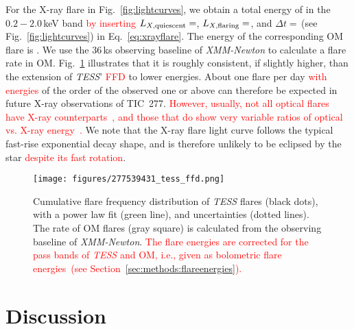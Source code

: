 \documentclass[twocolumn]{aastex631}
\begin{document}
For the X-ray flare in Fig.~\ref{fig:lightcurves}, we obtain a total energy of \eepic in the $0.2-2.0\,$keV band \textcolor{red}{by inserting} $L_{X,\rm quiescent}=$\LXquiet\unskip, $L_{X,\rm flaring}=$\LXflaring\unskip, and $\Delta t =$\xraydur\unskip\,(see Fig.~\ref{fig:lightcurves}) in Eq.~\ref{eq:xrayflare}. The energy of the corresponding OM flare is \eom\unskip. We use the $36\,$ks observing baseline of \textit{XMM-Newton} to calculate a flare rate in OM. Fig.~\ref{fig:ffd} illustrates that it is roughly consistent, if slightly higher, than the extension of \textit{TESS}' \textcolor{red}{FFD} to lower energies. About one flare per day \textcolor{red}{with energies} of the order of the observed one or above can therefore be expected in future X-ray observations of TIC~277. \textcolor{red}{However, usually, not all optical flares have X-ray counterparts~\citep{paudel2021simultaneous}, and those that do show very variable ratios of optical vs. X-ray energy~\citep{guarcello2019simultaneous, kuznetsov2021stellar}.} We note that the X-ray flare light curve follows the typical fast-rise exponential decay shape, and is therefore unlikely to be eclipsed by the star \textcolor{red}{despite its fast rotation}. %


\begin{figure}
    \begin{centering}
        \texttt{[image: figures/277539431\_tess\_ffd.png]}
        \caption{
         Cumulative flare frequency distribution of \textit{TESS} flares (black dots), with a power law fit (green line), and uncertainties (dotted lines). The rate of OM flares (gray square) is calculated from the observing baseline of \textit{XMM-Newton}. \textcolor{red}{The flare energies are corrected for the pass bands of \textit{TESS} and OM, i.e., given as bolometric flare energies~(see Section~\ref{sec:methods:flareenergies}).} 
        }
        \label{fig:ffd}
    \end{centering}
\end{figure}

\section{Discussion}
\label{sec:discussion}
\end{document}
